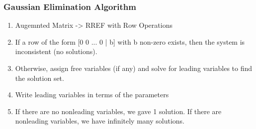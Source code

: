 \subsubsection*{Gaussian Elimination Algorithm}
\begin{enumerate}
    \item Augemnted Matrix -> RREF with Row Operations
    \item If a row of the form [0 0 ... 0 | b] with b non-zero exists, then the system is inconsistent (no solutions).
    \item Otherwise, assign free variables (if any) and solve for leading variables to find the solution set.
    \item Write leading variables in terms of the parameters
    \item If there are no nonleading variables, we gave 1 solution. If there are nonleading variables, we have infinitely many solutions.
\end{enumerate}



